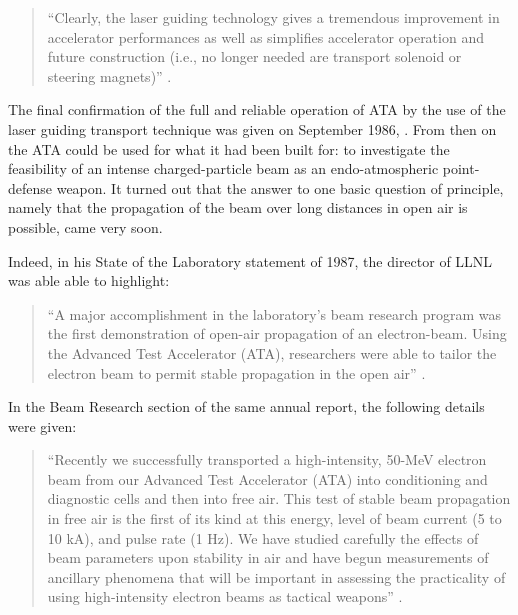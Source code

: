 \documentclass [12pt,a4paper,     ]{report} %
\begin{document}
\begin{quote}

``Clearly, the laser guiding technology gives  a tremendous improvement in accelerator performances as well as simplifies accelerator operation and future construction (i.e., no longer needed are transport solenoid or steering magnets)'' \cite[p.3145]{PRONO1985B}.

\end{quote}

The final confirmation of the full and reliable operation of ATA by the use of the laser guiding transport technique was given on September 1986, \cite{CAPOR1986-, MILLE1987-}.  From then on the ATA could be used for what it had been built for: to investigate the feasibility of an intense charged-particle beam as an endo-atmospheric point-defense weapon.  It turned out that the answer to one basic question of principle, namely that the propagation of the beam over long distances in open air is possible, came very soon.



Indeed, in his State of the Laboratory statement of 1987, the director of LLNL was able able to highlight:

\begin{quote}

``A major accomplishment in the laboratory's beam research program was the first demonstration of open-air propagation of an electron-beam.  Using the Advanced Test Accelerator (ATA), researchers were able to tailor the electron beam to permit stable propagation in the open air'' \cite[p.3]{LLNL1987A}.

\end{quote}

In the Beam Research section of the same annual report, the following details were given:

\begin{quote}

``Recently we successfully transported a high-intensity, 50-MeV electron beam from our Advanced Test Accelerator (ATA) into conditioning and diagnostic cells and then into free air.  This test of stable beam propagation in free air is the first of its kind at this energy, level of beam current (5 to 10 kA), and pulse rate (1 Hz).  We have studied carefully the effects of beam parameters upon stability in air and have begun measurements of ancillary phenomena that will be important in assessing the practicality of using high-intensity electron beams as tactical weapons'' \cite[p.54]{LLNL1987B}.

\end{quote}
\end{document}
